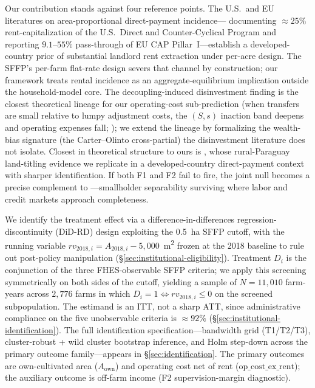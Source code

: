 \documentclass[12pt, a4paper]{article}
\begin{document}
Our contribution stands against four reference points. The U.S.\ and EU literatures on area-proportional direct-payment incidence---\citet{Kirwan2009_rentcap} documenting $\approx 25\%$ rent-capitalization of the U.S.\ Direct and Counter-Cyclical Program and \citet{BaldoniCiaian2023_eucap} reporting $9.1$--$55\%$ pass-through of EU CAP Pillar~I---establish a developed-country prior of substantial landlord rent extraction under per-acre design. The SFFP's per-farm flat-rate design severs that channel by construction; our framework treats rental incidence as an aggregate-equilibrium implication outside the household-model core. The \citet{Kazukauskas2013_disinvestment} decoupling-induced disinvestment finding is the closest theoretical lineage for our operating-cost sub-prediction (when transfers are small relative to lumpy adjustment costs, the $(S,s)$ inaction band deepens and operating expenses fall; \citealp{CaballeroEngel1999_lumpy}); we extend the lineage by formalizing the wealth-bias signature (the Carter--Olinto cross-partial) the disinvestment literature does not isolate. Closest in theoretical structure to ours is \citet{CarterOlinto2003_liquidity}, whose rural-Paraguay land-titling evidence we replicate in a developed-country direct-payment context with sharper identification. If both F1 and F2 fail to fire, the joint null becomes a precise complement to \citet{LaFaveThomas2016_markets}---smallholder separability surviving where labor and credit markets approach completeness.

We identify the treatment effect via a difference-in-differences regression-discontinuity (DiD-RD) design exploiting the 0.5~ha SFFP cutoff, with the running variable $rv_{2018,i} = A_{2018,i} - 5{,}000$~m\textsuperscript{2} frozen at the 2018 baseline to rule out post-policy manipulation (\S\ref{sec:institutional-eligibility}). Treatment $D_i$ is the conjunction of the three FHES-observable SFFP criteria; we apply this screening symmetrically on both sides of the cutoff, yielding a sample of $N = 11{,}010$ farm-years across $2{,}776$ farms in which $D_i = 1 \iff rv_{2018,i} \le 0$ on the screened subpopulation. The estimand is an ITT, not a sharp ATT, since administrative compliance on the five unobservable criteria is $\approx 92\%$ (\S\ref{sec:institutional-identification}). The full identification specification---bandwidth grid (T1/T2/T3), cluster-robust + wild cluster bootstrap inference, and Holm step-down across the primary outcome family---appears in \S\ref{sec:identification}. The primary outcomes are own-cultivated area ($A_{\text{own}}$) and operating cost net of rent ($\text{op\_cost\_ex\_rent}$); the auxiliary outcome is off-farm income (F2 supervision-margin diagnostic).
\end{document}
